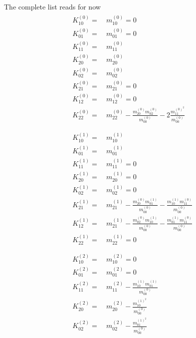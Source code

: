 The complete list reads for now
\begin{align}
  \label{eq: expansions of cumulants zeroth order raw}
  &\begin{aligned}
    K_{10}^{(0)} =&\ m_{10}^{(0)}=0\\
    K_{01}^{(0)} =&\ m_{01}^{(0)}=0\\
    K_{11}^{(0)} =&\ m_{11}^{(0)}\\
    K_{20}^{(0)} =&\ m_{20}^{(0)}\\
    K_{02}^{(0)} =&\ m_{02}^{(0)}\\
    K_{21}^{(0)} =&\ m_{21}^{(0)}=0\\
    K_{12}^{(0)} =&\ m_{12}^{(0)}=0\\
    K_{22}^{(0)} =&\ m_{22}^{(0)} - \frac{ m_{20}^{(0)} m_{02}^{(0)} }{m_{00}^{(0)}} - 2\frac{ m_{11}^{{(0)}^2}}{m_{00}^{(0)}}
  \end{aligned}
  \\\nonumber&\\&
  \label{eq: expansions of cumulants first order raw}
  \begin{aligned}
    K_{10}^{(1)} =&\ m_{10}^{(1)}\\
    K_{01}^{(1)} =&\ m_{01}^{(1)}\\
    K_{11}^{(1)} =&\ m_{11}^{(1)} = 0 \\
    K_{20}^{(1)} =&\ m_{20}^{(1)} = 0\\
    K_{02}^{(1)} =&\ m_{02}^{(1)} = 0\\
    K_{21}^{(1)} =&\ m_{21}^{(1)}
    - \frac{m_{20}^{(0)} m_{01}^{(1)}}{m_{00}^{(0)}}
    - \frac{m_{10}^{(1)} m_{11}^{(0)}}{m_{00}^{(0)}} \\
    K_{12}^{(1)} =&\ m_{21}^{(1)}
    - \frac{m_{02}^{(0)} m_{10}^{(1)}}{m_{00}^{(0)}}
    - \frac{m_{01}^{(1)} m_{11}^{(0)}}{m_{00}^{(0)}} \\
    K_{22}^{(1)} =&\ m_{22}^{(1)} = 0
  \end{aligned}
\\\nonumber&\\&
  \label{eq: expansions of cumulants second order raw}
  \begin{aligned}
    K_{10}^{(2)} =&\ m_{10}^{(2)} = 0\\
    K_{01}^{(2)} =&\ m_{01}^{(2)} = 0\\
    K_{11}^{(2)} =&\ m_{11}^{(2)} - \frac{ m_{10}^{(1)}m_{01}^{(1)}}{m_{00}^{(0)}} \\
    K_{20}^{(2)} =&\ m_{20}^{(2)} - \frac{ m_{10}^{{(1)}^2}}{m_{00}^{(0)}} \\
    K_{02}^{(2)} =&\ m_{02}^{(2)} - \frac{ m_{01}^{{(1)}^2}}{m_{00}^{(0)}} \\

\end{aligned}
\end{align}
